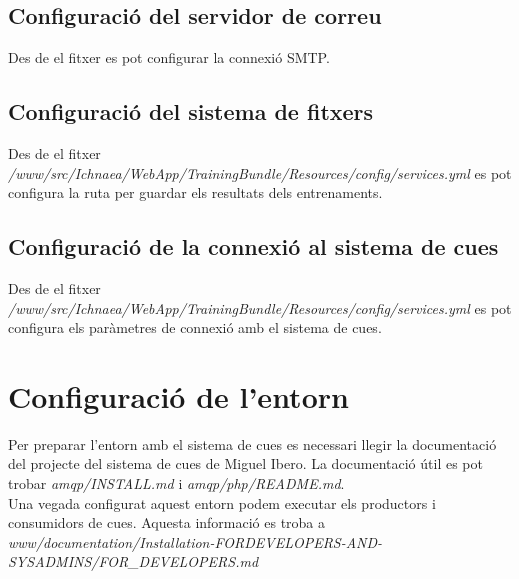 \subsection{Configuració del servidor de correu}
Des de el fitxer  es pot configurar la connexió SMTP.

\subsection{Configuració del sistema de fitxers}
Des de el fitxer \textit{/www/src/Ichnaea/WebApp/TrainingBundle/Resources/config/services.yml} es pot configura la ruta per guardar els resultats dels entrenaments.

\subsection{Configuració de la connexió al sistema de cues}
Des de el fitxer \textit{/www/src/Ichnaea/WebApp/TrainingBundle/Resources/config/services.yml} es pot configura els paràmetres de connexió amb el sistema de cues.

\section{Configuració de l'entorn}
Per preparar l'entorn amb el sistema de cues es necessari llegir la documentació del projecte del sistema de cues de Miguel Ibero. La documentació útil es pot trobar \textit{amqp/INSTALL.md} i \textit{amqp/php/README.md}.\\

Una vegada configurat aquest entorn podem executar els productors i consumidors de cues. Aquesta informació es troba a \textit{www/documentation/Installation-FORDEVELOPERS-AND-SYSADMINS/FOR\_DEVELOPERS.md}

